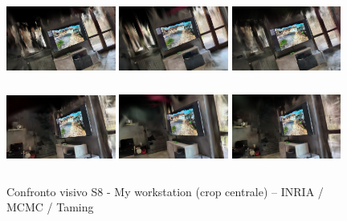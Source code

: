 \begin{figure}[ht]
	\centering
	\includegraphics[width=0.32\textwidth,height=2.8cm,trim={80 40 80 40},clip]{images/benchmarks/my_workstation_inria_balanced_1.jpg}
	\includegraphics[width=0.32\textwidth,height=2.8cm,trim={80 40 80 40},clip]{images/benchmarks/my_workstation_mcmc_balanced_1.jpg}
	\includegraphics[width=0.32\textwidth,height=2.8cm,trim={80 40 80 40},clip]{images/benchmarks/my_workstation_taming_balanced_1.jpg}
		\includegraphics[width=0.32\textwidth,height=2.8cm,trim={80 40 80 40},clip]{images/benchmarks/my_workstation_inria_balanced_2.jpg}
	\includegraphics[width=0.32\textwidth,height=2.8cm,trim={80 40 80 40},clip]{images/benchmarks/my_workstation_mcmc_balanced_2.jpg}
	\includegraphics[width=0.32\textwidth,height=2.8cm,trim={80 40 80 40},clip]{images/benchmarks/my_workstation_taming_balanced_2.jpg}
	\caption{Confronto visivo S8 - My workstation (crop centrale) -- INRIA / MCMC / Taming}
	\label{fig:my_workstation_comparison}
\end{figure}



